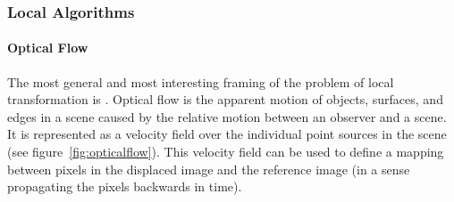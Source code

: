 \subsubsection{Local Algorithms}
\paragraph{Optical Flow}

The most general and most interesting framing of the problem of local transformation is .
%
Optical flow is the apparent motion of objects, surfaces, and edges in a scene caused by the relative motion between an observer and a scene.
%
It is represented as a velocity field over the individual point sources in the scene (see figure~\ref{fig:opticalflow}).
%
This velocity field can be used to define a mapping between pixels in the displaced image and the reference image (in a sense propagating the pixels backwards in time).

